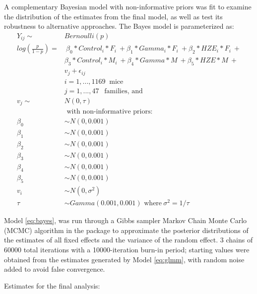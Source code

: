 \documentclass[12pt]{article}
\begin{document}
A complementary Bayesian model with non-informative priors was fit to examine the distribution of the estimates from the final model, as well as test its robustness to alternative approaches. The Bayes model is parameterized as:\\
\begin{equation}
\begin{aligned}
Y_{ij} \sim &Bernoulli(p)\\
log(\frac{p}{1-p}) = &\ \beta_0*Control_i*F_i\ +\beta_1*Gamma_i*F_i\ + \beta_2*HZE_i*F_i\ + \\ &\beta_3*Control_i*M_i\ +\beta_4*Gamma*M\ + \beta_5*HZE*M\ + \\
&v_{j} + \epsilon_{ij}\\
&i = 1, ..., 1169\ \mbox{ mice} \\
&j = 1,...,47\ \ \mbox{ families, and} \\
v_j \sim\ &N(0, \tau)
\\
&\mbox{ with non-informative priors:}\\
\beta_0 &\sim N(0, 0.001)\\
\beta_1 &\sim N(0, 0.001)\\
\beta_2 &\sim N(0, 0.001)\\
\beta_3 &\sim N(0, 0.001)\\
\beta_4 &\sim N(0, 0.001)\\
\beta_5 &\sim N(0, 0.001)\\
v_i &\sim N(0, \sigma^2)\\
\tau &\sim Gamma(0.001, 0.001) \mbox{ where}\ \sigma^2 = 1/\tau 
\end{aligned}
\label{eq:bayes}
\end{equation}

Model \eqref{eq:bayes}, was run through a Gibbs sampler Markov Chain Monte Carlo (MCMC) algorithm in the \citep{R-rjags} package to approximate the posterior distributions of the estimates of all fixed effects and the variance of the random effect. 3 chains of 60000 total iterations with a 10000-iteration burn-in period; starting values were obtained from the estimates generated by Model \eqref{eq:glmm}, with random noise added to avoid false convergence.

Estimates for the final analysis:
\end{document}
